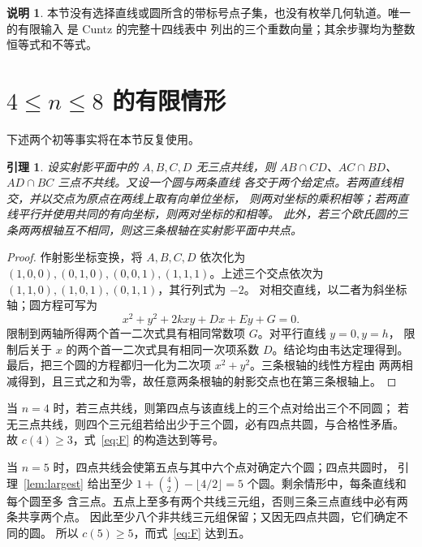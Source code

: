 \documentclass[11pt,a4paper]{ctexart}
\newtheorem{lemma}[theorem]{引理}
\theoremstyle{definition}
\newtheorem{remark}[theorem]{说明}
\begin{document}
\begin{remark}
本节没有选择直线或圆所含的带标号点子集，也没有枚举几何轨道。唯一的有限输入
是 Cuntz 的完整十四线表中
列出的三个重数向量；其余步骤均为整数恒等式和不等式。
\end{remark}



\section{\texorpdfstring{$4\le n\le8$}{4<=n<=8} 的有限情形}

下述两个初等事实将在本节反复使用。
\begin{lemma}\label{lem:two-line-geometry}
设实射影平面中的 $A,B,C,D$ 无三点共线，则
$AB\cap CD$、$AC\cap BD$、$AD\cap BC$ 三点不共线。又设一个圆与两条直线
各交于两个给定点。若两直线相交，并以交点为原点在两线上取有向单位坐标，
则两对坐标的乘积相等；若两直线平行并使用共同的有向坐标，则两对坐标的和相等。
此外，若三个欧氏圆的三条两两根轴互不相同，则这三条根轴在实射影平面中共点。
\end{lemma}
\begin{proof}
作射影坐标变换，将 $A,B,C,D$ 依次化为
$(1,0,0),(0,1,0),(0,0,1),(1,1,1)$。上述三个交点依次为
$(1,1,0),(1,0,1),(0,1,1)$，其行列式为 $-2$。
对相交直线，以二者为斜坐标轴；圆方程可写为
\[
x^2+y^2+2kxy+Dx+Ey+G=0.
\]
限制到两轴所得两个首一二次式具有相同常数项 $G$。对平行直线 $y=0,y=h$，
限制后关于 $x$ 的两个首一二次式具有相同一次项系数 $D$。结论均由韦达定理得到。
最后，把三个圆的方程都归一化为二次项 $x^2+y^2$。三条根轴的线性方程由
两两相减得到，且三式之和为零，故任意两条根轴的射影交点也在第三条根轴上。
\end{proof}

当 $n=4$ 时，若三点共线，则第四点与该直线上的三个点对给出三个不同圆；
若无三点共线，则四个三元组若给出少于三个圆，必有四点共圆，与合格性矛盾。
故 $c(4)\ge3$，式~\eqref{eq:F} 的构造达到等号。

当 $n=5$ 时，四点共线会使第五点与其中六个点对确定六个圆；四点共圆时，
引理~\ref{lem:largest} 给出至少
$1+\binom42-\lfloor4/2\rfloor=5$ 个圆。剩余情形中，每条直线和每个圆至多
含三点。五点上至多有两个共线三元组，否则三条三点直线中必有两条共享两个点。
因此至少八个非共线三元组保留；又因无四点共圆，它们确定不同的圆。
所以 $c(5)\ge5$，而式~\eqref{eq:F} 达到五。
\end{document}

